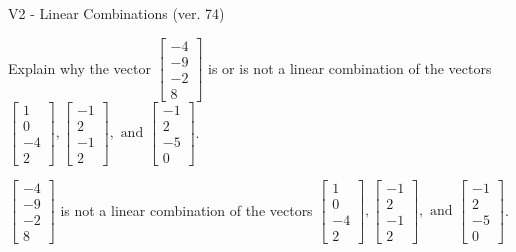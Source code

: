 \begin{exercise}
  \begin{exerciseTitle}V2 - Linear Combinations (ver. 74)\end{exerciseTitle}
  \begin{exerciseStatement}
    Explain why the vector \(\left[\begin{array}{c}
-4 \\
-9 \\
-2 \\
8
\end{array}\right]\)  is or is not a linear 
	combination of the vectors \(\left[\begin{array}{c}
1 \\
0 \\
-4 \\
2
\end{array}\right] , \left[\begin{array}{c}
-1 \\
2 \\
-1 \\
2
\end{array}\right] , \text{ and } \left[\begin{array}{c}
-1 \\
2 \\
-5 \\
0
\end{array}\right]\).
	


  \end{exerciseStatement}
  \begin{exerciseAnswer}
   \(\left[\begin{array}{c}
-4 \\
-9 \\
-2 \\
8
\end{array}\right]\) 
  	 is not  
	a linear combination of the vectors \(\left[\begin{array}{c}
1 \\
0 \\
-4 \\
2
\end{array}\right] , \left[\begin{array}{c}
-1 \\
2 \\
-1 \\
2
\end{array}\right] , \text{ and } \left[\begin{array}{c}
-1 \\
2 \\
-5 \\
0
\end{array}\right]\).

	
  


  \end{exerciseAnswer}
\end{exercise}